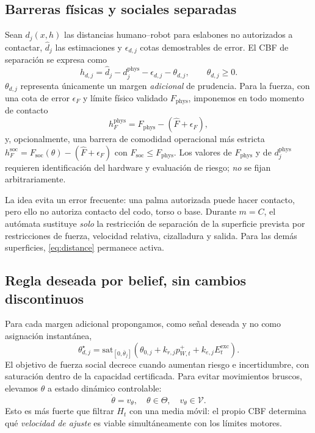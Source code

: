 \documentclass[10pt,a4paper,twocolumn]{article}
\newcommand{\calV}{\mathcal{V}}
\begin{document}
\subsection{Barreras físicas y sociales separadas}
Sean $d_j(x,h)$ las distancias humano--robot para eslabones no autorizados a contactar, $\hat d_j$ las estimaciones y $\epsilon_{d,j}$ cotas demostrables de error. El CBF de separación se expresa como
\begin{equation}
 h_{d,j}=\hat d_j-d_{j}^{\mathrm{phys}}-\epsilon_{d,j}-\theta_{d,j},\qquad \theta_{d,j}\ge0.
 \label{eq:distance}
\end{equation}
$\theta_{d,j}$ representa únicamente un margen \emph{adicional} de prudencia. Para la fuerza, con una cota de error $\epsilon_F$ y límite físico validado $F_{\mathrm{phys}}$, imponemos en todo momento de contacto
\begin{equation}
 h_F^{\mathrm{phys}}=F_{\mathrm{phys}}-(\hat F+\epsilon_F),
 \label{eq:force}
\end{equation}
y, opcionalmente, una barrera de comodidad operacional más estricta $h_F^{\mathrm{soc}}=F_{\mathrm{soc}}(\theta)-(\hat F+\epsilon_F)$ con $F_{\mathrm{soc}}\le F_{\mathrm{phys}}$. Los valores de $F_{\mathrm{phys}}$ y de $d_j^{\mathrm{phys}}$ requieren identificación del hardware y evaluación de riesgo; \emph{no} se fijan arbitrariamente.

La idea evita un error frecuente: una palma autorizada puede hacer contacto, pero ello no autoriza contacto del codo, torso o base. Durante $m=C$, el autómata sustituye \emph{solo} la restricción de separación de la superficie prevista por restricciones de fuerza, velocidad relativa, cizalladura y salida. Para las demás superficies, \eqref{eq:distance} permanece activa.

\subsection{Regla deseada por belief, sin cambios discontinuos}
Para cada margen adicional propongamos, como señal deseada y no como asignación instantánea,
\begin{equation}
\theta_{d,j}^{\star}=\mathrm{sat}_{[0,\bar\theta_j]}\!\left(\theta_{0,j}
 +k_{r,j}p^+_{W,t}+k_{e,j}E_t^{\mathrm{exc}}\right).
\label{eq:theta_des}
\end{equation}
El objetivo de fuerza social decrece cuando aumentan riesgo e incertidumbre, con saturación dentro de la capacidad certificada. Para evitar movimientos bruscos, elevamos $\theta$ a estado dinámico controlable:
\begin{equation}
 \dot\theta=v_\theta,\quad \theta\in\Theta,\quad
 v_\theta\in\calV. \label{eq:gov}
\end{equation}
Esto es más fuerte que filtrar $H_t$ con una media móvil: el propio CBF determina qué \emph{velocidad de ajuste} es viable simultáneamente con los límites motores.
\end{document}
